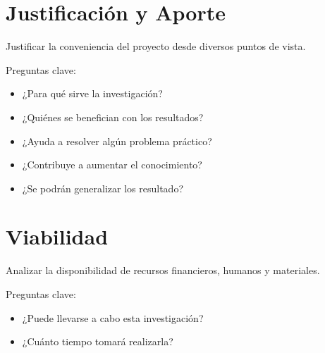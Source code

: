 \begin{ejemplo}
\blindtext %
\end{ejemplo} 

\section{Justificación y Aporte}
Justificar la conveniencia del proyecto desde diversos puntos de vista.

Preguntas clave:
  \begin{itemize}
  \item ¿Para qué sirve la investigación?
  \item ¿Quiénes se benefician con los resultados?
  \item ¿Ayuda a resolver algún problema práctico?
  \item ¿Contribuye a aumentar el conocimiento?
  \item ¿Se podrán generalizar los resultado?
\end{itemize}



\begin{ejemplo}
\blindtext %
\end{ejemplo}


\section{Viabilidad}
Analizar la disponibilidad de recursos financieros, humanos y materiales.

Preguntas clave:
  \begin{itemize}\justifying
  \item ¿Puede llevarse a cabo esta investigación?
  \item ¿Cuánto tiempo tomará realizarla?
\end{itemize}
